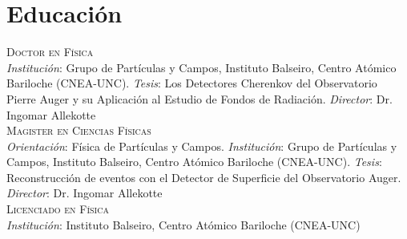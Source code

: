 \section*{Educación}
\noindent
{}\textsc{Doctor en Física}\\
{\emph{Institución}}: Grupo de Partículas y Campos, Instituto Balseiro, Centro Atómico Bariloche (CNEA-UNC). {\emph{Tesis}}: Los Detectores Cherenkov del Observatorio Pierre Auger y su Aplicación al Estudio de Fondos de Radiación. {\emph{Director}}: Dr. Ingomar Allekotte\\
\textsc{Magister en Ciencias Físicas}\\
{\emph{Orientación}}: Física de Partículas y Campos. {\emph{Institución}}: Grupo de Partículas y Campos, Instituto Balseiro, Centro Atómico Bariloche (CNEA-UNC). {\emph{Tesis}}: Reconstrucción de eventos con el Detector de Superficie del Observatorio Auger. {\emph{Director}}: Dr. Ingomar Allekotte\\
\textsc{Licenciado en Física}\\
{\emph{Institución}}: Instituto Balseiro, Centro Atómico Bariloche (CNEA-UNC)\\
\fi
